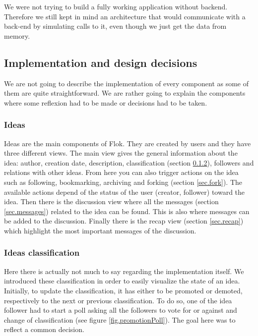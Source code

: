 \documentclass[a4paper,12pt, oneside]{article}
\begin{document}
We were not trying to build a fully working application without backend.
Therefore we still kept in mind an architecture that would communicate with a back-end by simulating calls to it, even though we just get the data from memory.

\subsection{Implementation and design decisions}
We are not going to describe the implementation of every component as some of them are quite straightforward.
We are rather going to explain the components where some reflexion had to be made or decisions had to be taken.

\subsubsection{Ideas}
Ideas are the main components of Flok.
They are created by users and they have three different views.
The main view gives the general information about the idea: author, creation date, description, classification (section \ref{sec.ideasClassification}), followers and relations with other ideas.
From here you can also trigger actions on the idea such as following, bookmarking, archiving and forking (section \ref{sec.fork}).
The available actions depend of the status of the user (creator, follower) toward the idea.
Then there is the discussion view where all the messages (section \ref{sec.messages}) related to the idea can be found.
This is also where messages can be added to the discussion.
Finally there is the recap view (section \ref{sec.recap}) which highlight the most important messages of the discussion.

\subsubsection{Ideas classification}
\label{sec.ideasClassification}
Here there is actually not much to say regarding the implementation itself.
We introduced these classification in order to easily visualize the state of an idea.
Initially, to update the classification, it has either to be promoted or demoted, respectively to the next or previous classification.
To do so, one of the idea follower had to start a poll asking all the followers to vote for or against and change of classification (see figure \ref{fig.promotionPoll}).
The goal here was to reflect a common decision.
\end{document}
